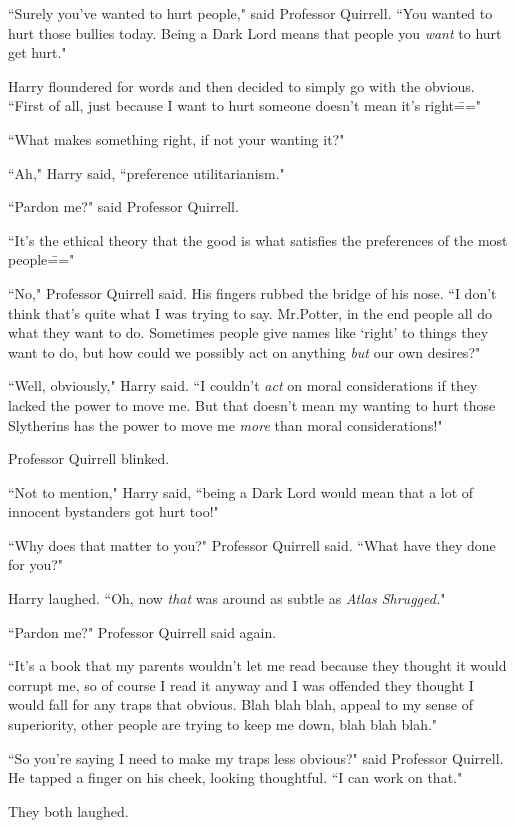 ``Surely you've wanted to hurt people," said Professor Quirrell. ``You wanted to hurt those bullies today. Being a Dark Lord means that people you \emph{want} to hurt get hurt."

Harry floundered for words and then decided to simply go with the obvious. ``First of all, just because I want to hurt someone doesn't mean it's right\==="

``What makes something right, if not your wanting it?"

``Ah," Harry said, ``preference utilitarianism."

``Pardon me?" said Professor Quirrell.

``It's the ethical theory that the good is what satisfies the preferences of the most people\==="

``No," Professor Quirrell said. His fingers rubbed the bridge of his nose. ``I don't think that's quite what I was trying to say. Mr.\?Potter, in the end people all do what they want to do. Sometimes people give names like `right' to things they want to do, but how could we possibly act on anything \emph{but} our own desires?"

``Well, obviously," Harry said. ``I couldn't \emph{act} on moral considerations if they lacked the power to move me. But that doesn't mean my wanting to hurt those Slytherins has the power to move me \emph{more} than moral considerations!"

Professor Quirrell blinked.

``Not to mention," Harry said, ``being a Dark Lord would mean that a lot of innocent bystanders got hurt too!"

``Why does that matter to you?" Professor Quirrell said. ``What have they done for you?"

Harry laughed. ``Oh, now \emph{that} was around as subtle as \emph{Atlas Shrugged.}"

``Pardon me?" Professor Quirrell said again.

``It's a book that my parents wouldn't let me read because they thought it would corrupt me, so of course I read it anyway and I was offended they thought I would fall for any traps that obvious. Blah blah blah, appeal to my sense of superiority, other people are trying to keep me down, blah blah blah."

``So you're saying I need to make my traps less obvious?" said Professor Quirrell. He tapped a finger on his cheek, looking thoughtful. ``I can work on that."

They both laughed.

